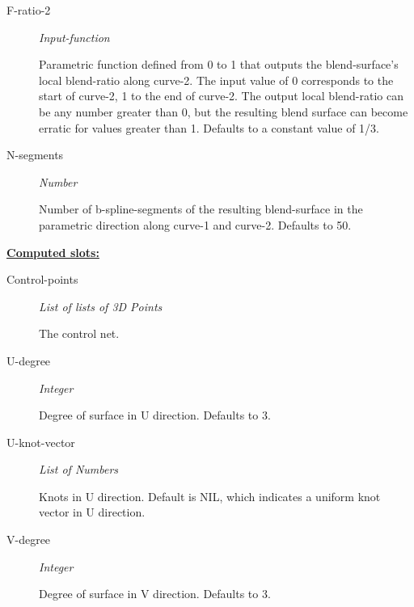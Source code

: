 \documentclass [11pt]{book}
\begin{document}
\begin{itemize}
\begin{description}
\item [F-ratio-2]
\emph{Input-function}

 Parametric function defined from 0 to 1 that outputs the blend-surface's local blend-ratio along curve-2. The input value of 0 corresponds to the start of curve-2, 1 to the end of curve-2. The output local blend-ratio can be any number greater than 0, but the resulting blend surface can become erratic for values greater than 1. Defaults to a constant value of 1/3.




\item [N-segments]
\emph{Number}

 Number of b-spline-segments of the resulting blend-surface in the parametric direction along curve-1 and curve-2. Defaults to 50.




\end{description}






\textbf{
\underline{Computed slots:}}

\begin{description}

\item [Control-points]
\emph{List of lists of 3D Points}

 The control net.




\item [U-degree]
\emph{Integer}

 Degree of surface in U direction. Defaults to 3.




\item [U-knot-vector]
\emph{List of Numbers}

 Knots in U direction. Default is NIL, which indicates a uniform knot vector in U direction.




\item [V-degree]
\emph{Integer}

 Degree of surface in V direction. Defaults to 3.




\end{description}








\end{itemize}
\end{document}
